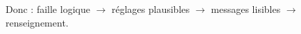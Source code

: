 \documentclass[preview]{standalone}
\begin{document}
\begin{center}
Donc : faille logique $\to$ r\'eglages plausibles $\to$ messages lisibles $\to$ renseignement.
\end{center}
\end{document}
